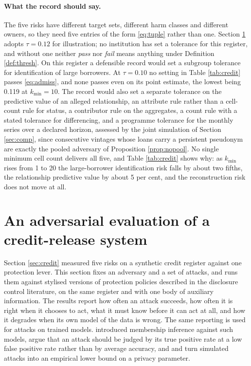 \documentclass[11pt,a4paper]{article}
\theoremstyle{plain}
\theoremstyle{definition}
\theoremstyle{definition}
\theoremstyle{plain}
\begin{document}
\paragraph{What the record should say.} The five risks have different target
sets, different harm classes and different owners, so they need five entries of
the form \eqref{eq:tuple} rather than one. Section \ref{sec:eval} adopts
$\tau = 0.12$ for illustration; no institution has set a tolerance for this
register, and without one neither \textit{pass} nor \textit{fail} means anything
under Definition \ref{def:thresh}. On this register a defensible record would set
a subgroup tolerance for identification of large borrowers. At $\tau = 0.10$ no
setting in Table \ref{tab:credit} passes \eqref{eq:admiss}, and none passes even
on its point estimate, the lowest being 0.119 at $k_{\min} = 10$. The record
would also set a separate tolerance on the predictive value of an alleged
relationship, an attribute rule rather than a cell-count rule for status, a
contributor rule on the aggregates, a count rule with a stated tolerance for
differencing, and a programme tolerance for the monthly series over a declared
horizon, assessed by the joint simulation of Section \ref{sec:comp}, since
consecutive vintages whose loans carry a persistent pseudonym are exactly the
pooled adversary of Proposition \ref{prop:nopool}. No single minimum cell count
delivers all five, and Table \ref{tab:credit} shows why: as $k_{\min}$ rises from
1 to 20 the large-borrower identification risk falls by about two fifths, the
relationship predictive value by about 5 per cent, and the reconstruction risk
does not move at all.

\section{An adversarial evaluation of a credit-release system}\label{sec:eval}

Section \ref{sec:credit} measured five risks on a synthetic credit register
against one protection lever. This section fixes an adversary and a set of
attacks, and runs them against stylised versions of protection policies
described in the disclosure control literature, on the same register and with
one body of auxiliary information. The results report how often an attack
succeeds, how often it is right when it chooses to act, what it must know before
it can act at all, and how it degrades when its own model of the data is wrong.
The same reporting is used for attacks on trained models. \citet{shokri2017}
introduced membership inference against such models, \citet{carlini2022} argue
that an attack should be judged by its true positive rate at a low false positive
rate rather than by average accuracy, and \citet{jagielski2020} and
\citet{steinke2023} turn simulated attacks into an empirical lower bound on a
privacy parameter.
\end{document}
